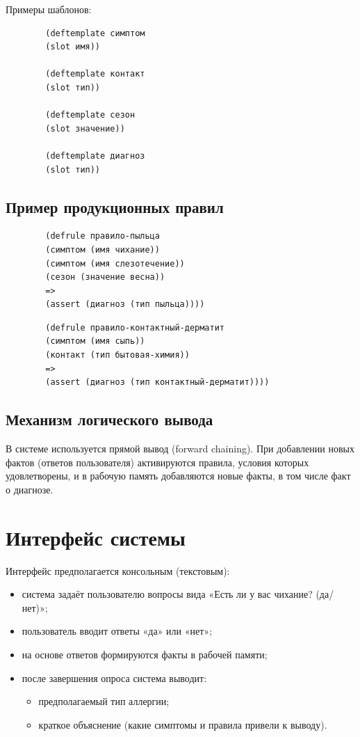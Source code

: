 \documentclass[a4paper,14pt]{extarticle}
\begin{document}
	Примеры шаблонов:
	
	\begin{verbatim}
		(deftemplate симптом
		(slot имя))
		
		(deftemplate контакт
		(slot тип))
		
		(deftemplate сезон
		(slot значение))
		
		(deftemplate диагноз
		(slot тип))
	\end{verbatim}
	
	\subsection{Пример продукционных правил}
	
	\begin{verbatim}
		(defrule правило-пыльца
		(симптом (имя чихание))
		(симптом (имя слезотечение))
		(сезон (значение весна))
		=>
		(assert (диагноз (тип пыльца))))
	\end{verbatim}
	
	\begin{verbatim}
		(defrule правило-контактный-дерматит
		(симптом (имя сыпь))
		(контакт (тип бытовая-химия))
		=>
		(assert (диагноз (тип контактный-дерматит))))
	\end{verbatim}
	
	\subsection{Механизм логического вывода}
	
	В системе используется прямой вывод (forward chaining). При добавлении новых фактов (ответов пользователя) активируются правила, условия которых удовлетворены, и в рабочую память добавляются новые факты, в том числе факт о диагнозе.
	
	\newpage
	
	\section{Интерфейс системы}
	
	Интерфейс предполагается консольным (текстовым):
	
	\begin{itemize}
		\item система задаёт пользователю вопросы вида «Есть ли у вас чихание? (да/нет)»;
		\item пользователь вводит ответы «да» или «нет»;
		\item на основе ответов формируются факты в рабочей памяти;
		\item после завершения опроса система выводит:
		\begin{itemize}
			\item предполагаемый тип аллергии;
			\item краткое объяснение (какие симптомы и правила привели к выводу).
		\end{itemize}
	\end{itemize}
	
\end{document}

